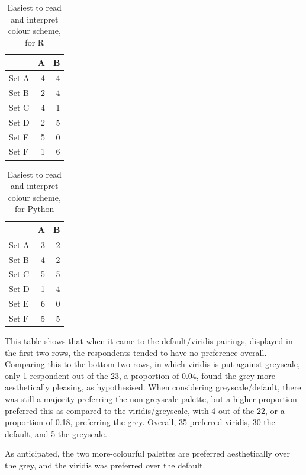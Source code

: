 \documentclass[
  11pt,
]{book}
\begin{document}
\begin{table}[!h]

\caption{\label{tab:unnamed-chunk-69}Easiest to read and interpret colour scheme, for R}
\centering
\begin{tabular}[t]{l|r|r}
\hline
  & A & B\\
\hline
Set A & 4 & 4\\
\hline
Set B & 2 & 4\\
\hline
Set C & 4 & 1\\
\hline
Set D & 2 & 5\\
\hline
Set E & 5 & 0\\
\hline
Set F & 1 & 6\\
\hline
\end{tabular}
\end{table}

\begin{table}[!h]

\caption{\label{tab:unnamed-chunk-69}Easiest to read and interpret colour scheme, for Python}
\centering
\begin{tabular}[t]{l|r|r}
\hline
  & A & B\\
\hline
Set A & 3 & 2\\
\hline
Set B & 4 & 2\\
\hline
Set C & 5 & 5\\
\hline
Set D & 1 & 4\\
\hline
Set E & 6 & 0\\
\hline
Set F & 5 & 5\\
\hline
\end{tabular}
\end{table}

This table shows that when it came to the default/viridis pairings,
displayed in the first two rows, the respondents tended to have no
preference overall. Comparing this to the bottom two rows, in which
viridis is put against greyscale, only 1 respondent out of the 23, a
proportion of 0.04, found the grey more aesthetically pleasing, as
hypothesised. When considering greyscale/default, there was still a
majority preferring the non-greyscale palette, but a higher proportion
preferred this as compared to the viridis/greyscale, with 4 out of the
22, or a proportion of 0.18, preferring the grey. Overall, 35 preferred
viridis, 30 the default, and 5 the greyscale.

As anticipated, the two more-colourful palettes are preferred
aesthetically over the grey, and the viridis was preferred over the
default.
\end{document}
